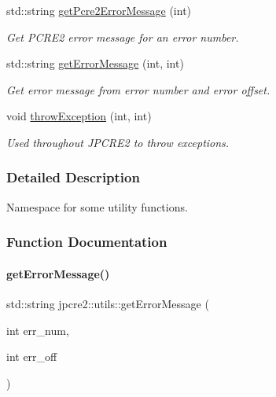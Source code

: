\begin{DoxyCompactItemize}
std\+::string \hyperlink{namespacejpcre2_1_1utils_a6f28489b48095eeaacfaa43a0a8e87a6_a6f28489b48095eeaacfaa43a0a8e87a6}{get\+Pcre2\+Error\+Message} (int)
\begin{DoxyCompactList}\small\item\em Get P\+C\+R\+E2 error message for an error number. \end{DoxyCompactList}\item 
std\+::string \hyperlink{namespacejpcre2_1_1utils_a58db3a9ce0296d70469611445cb42209_a58db3a9ce0296d70469611445cb42209}{get\+Error\+Message} (int, int)
\begin{DoxyCompactList}\small\item\em Get error message from error number and error offset. \end{DoxyCompactList}\item 
void \hyperlink{namespacejpcre2_1_1utils_a71c7842918bdcc6936266813981492dc_a71c7842918bdcc6936266813981492dc}{throw\+Exception} (int, int)
\begin{DoxyCompactList}\small\item\em Used throughout J\+P\+C\+R\+E2 to throw exceptions. \end{DoxyCompactList}\end{DoxyCompactItemize}


\subsubsection{Detailed Description}
Namespace for some utility functions. 

\subsubsection{Function Documentation}
\hypertarget{namespacejpcre2_1_1utils_a58db3a9ce0296d70469611445cb42209_a58db3a9ce0296d70469611445cb42209}{}\label{namespacejpcre2_1_1utils_a58db3a9ce0296d70469611445cb42209_a58db3a9ce0296d70469611445cb42209} 
\paragraph{\texorpdfstring{get\+Error\+Message()}{getErrorMessage()}}
{\footnotesize\ttfamily std\+::string jpcre2\+::utils\+::get\+Error\+Message (\begin{DoxyParamCaption}\item[{int}]{err\+\_\+num,  }\item[{int}]{err\+\_\+off }\end{DoxyParamCaption})}



